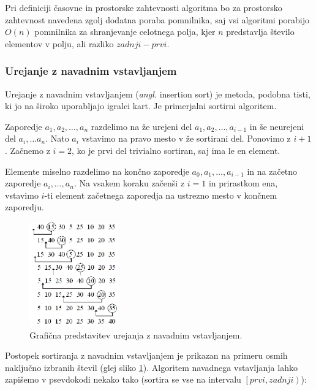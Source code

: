 \documentclass[a4paper,oneside]{article}
\begin{document}
Pri definiciji časovne in prostorske zahtevnosti algoritma bo za prostorsko zahtevnost 
navedena zgolj dodatna poraba pomnilnika, saj vsi algoritmi porabijo $O(n)$ pomnilnika za
shranjevanje celotnega polja, kjer $n$ predstavlja število elementov v polju, ali razliko
$zadnji - prvi$. 

\subsubsection{Urejanje z navadnim vstavljanjem}
\label{chapter:insertionsort}
Urejanje z navadnim vstavljanjem (\emph{angl.} insertion sort) je metoda,
podobna tisti, ki jo na široko uporabljajo igralci kart. Je primerjalni sortirni algoritem.

Zaporedje $a_1, a_2, \ldots, a_n$ razdelimo na že urejeni del $a_1, a_2, \ldots, a_{i-1}$
in še neurejeni del $a_i, \ldots a_n$. Nato $a_i$ vstavimo na pravo mesto v že sortirani
del. Ponovimo z $i + 1$. Začnemo z $i = 2$, ko je prvi del trivialno sortiran, saj ima le
en element.

Elemente miselno razdelimo na končno zaporedje $a_0, a_1, \ldots,
a_{i-1}$ in na začetno zaporedje $a_i,\ldots, a_n$. Na vsakem koraku začenši z $i = 1$ in
prirastkom ena, vstavimo $i$-ti element začetnega zaporedja na ustrezno mesto v končnem
zaporedju.

\begin{figure}[h]
    \begin{center}
        \includegraphics[height=45mm]{slike/insertionsort.png}
    \end{center}
    \vspace{-0.7cm}
    \caption{Grafična predstavitev urejanja z navadnim vstavljanjem.}
    \label{fig:insertionsortimage}
\end{figure}

Postopek sortiranja z navadnim vstavljanjem je prikazan na primeru osmih naključno
izbranih števil (glej sliko \ref{fig:insertionsortimage}). Algoritem navadnega
vstavljanja lahko zapišemo v psevdokodi nekako tako (sortira se vse na intervalu
$\left[prvi, zadnji\right)$):
\end{document}

